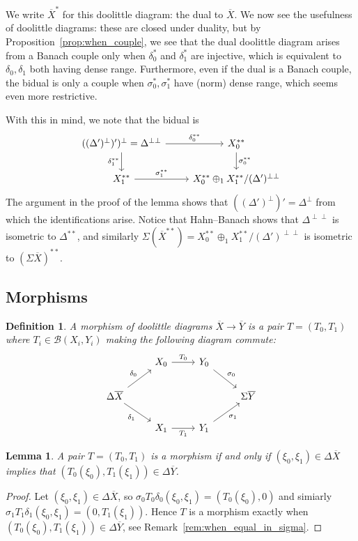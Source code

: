 \documentclass[a4paper,11pt]{article}
\theoremstyle{plain}
\newtheorem{lemma}[proposition]{Lemma}
\newtheorem{definition}[proposition]{Definition}
\theoremstyle{remark}
\newcommand{\mc}[1]{\mathcal{#1}}
\begin{document}
We write $\overline X^*$ for this doolittle diagram: the dual to $\overline X$.
We now see the usefulness of doolittle diagrams: these are closed under duality, but by Proposition~\ref{prop:when_couple}, we see that the dual doolittle diagram arises from a Banach couple only when $\delta_0^*$ and $\delta_1^*$ are injective, which is equivalent to $\delta_0,\delta_1$ both having dense range.  Furthermore, even if the dual is a Banach couple, the bidual is only a couple when $\sigma_0^*, \sigma_1^*$ have (norm) dense range, which seems even more restrictive.

With this in mind, we note that the bidual is
\[ \begin{tikzcd}
  ((\Delta')^\perp)')^\perp = \Delta^{\perp\perp} \arrow[r, "\delta_0^{**}"] \arrow[d, "\delta_1^{**}"'] & X_0^{**} \arrow[d, "\sigma_0^{**}"]\\
  X_1^{**} \arrow[r, "\sigma_1^{**}"] & X_0^{**} \oplus_1 X_1^{**} / (\Delta')^{\perp\perp}
\end{tikzcd} \]
The argument in the proof of the lemma shows that $((\Delta')^\perp)' = \Delta^\perp$ from which the identifications arise.  Notice that Hahn--Banach shows that $\Delta^{\perp\perp}$ is isometric to $\Delta^{**}$, and similarly $\Sigma(\overline X^{**}) = X_0^{**} \oplus_1 X_1^{**} / (\Delta')^{\perp\perp}$ is isometric to $(\Sigma\overline X)^{**}$.


\subsection{Morphisms}

\begin{definition}
A morphism of doolittle diagrams $\overline X \to \overline Y$ is a pair $T=(T_0, T_1)$ where $T_i\in\mc B(X_i, Y_i)$ making the following diagram commute:
\[ \begin{tikzcd} & X_0 \arrow[r, "T_0"] & Y_0 \arrow[rd, "\sigma_0"] \\
\Delta\overline X \arrow[ru, "\delta_0"] \arrow[rd, "\delta_1"'] & & &  \Sigma\overline Y \\
& X_1 \arrow[r, "T_1"'] & Y_1 \arrow[ru, "\sigma_1"'] \end{tikzcd} \]
\end{definition}

\begin{lemma}\label{lem:when_morphism}
A pair $T=(T_0,T_1)$ is a morphism if and only if $(\xi_0,\xi_1)\in\Delta\overline X$ implies that $(T_0(\xi_0), T_1(\xi_1)) \in \Delta\overline Y$.
\end{lemma}
\begin{proof}
Let $(\xi_0,\xi_1)\in\Delta\overline X$, so $\sigma_0 T_0 \delta_0(\xi_0,\xi_1) = (T_0(\xi_0), 0)$ and simiarly $\sigma_1 T_1 \delta_1(\xi_0,\xi_1) = (0, T_1(\xi_1))$.  Hence $T$ is a morphism exactly when $(T_0(\xi_0), T_1(\xi_1)) \in \Delta\overline Y$, see Remark~\ref{rem:when_equal_in_sigma}.
\end{proof}
\end{document}
